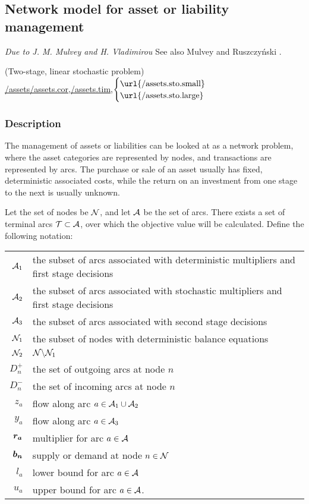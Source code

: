 \subsection{Network model for asset or liability management}%
\emph{Due to J. M. Mulvey and H. Vladimirou \cite{mulvey91}}\newline%
See also Mulvey and Ruszczy\'{n}ski \cite{mulvey95}.%

\noindent(Two-stage, linear stochastic problem)\\
\noindent\url{/assets}\url{/assets.cor},\url{/assets.tim},$\displaystyle \begin{cases} \text{\url{/assets.sto.small}}\\ \text{\url{/assets.sto.large}} \end{cases}$

\vspace{3mm}
\subsubsection{Description}
The management of assets or liabilities can be looked at as a network problem, where the asset categories are represented by nodes, and transactions are represented by arcs.  The purchase or sale of an asset usually has fixed, deterministic associated costs, while the return on an investment from one stage to the next is usually unknown.  

Let the set of nodes be ${\cal N}$, and let ${\cal A}$ be the set of arcs.  There exists a set of terminal arcs ${\cal T} \subset {\cal A}$, over which the objective value will be calculated.  Define the following notation:\newline
\vspace{0.2in}
\begin{tabular}{r@{=}p{4.2in}}
${\cal A}_1$	& the subset of arcs associated with deterministic multipliers and first stage decisions\\
${\cal A}_2$	&	the subset of arcs associated with stochastic multipliers and first stage decisions\\
${\cal A}_3$	&	the subset of arcs associated with second stage decisions\\
${\cal N}_1$	&	the subset of nodes with deterministic balance equations\\
${\cal N}_2$	&	${\cal N}\backslash {\cal N}_1$\\
$D_n^+$			&	the set of outgoing arcs at node $n$\\
$D_n^-$			&	the set of incoming arcs at node $n$\\
$z_a$			&	flow along arc $a \in {\cal A}_1 \cup {\cal A}_2$\\
$y_a$			&	flow along arc $a \in {\cal A}_3$\\
$\mathbf{\boldsymbol{r_a}}$	&	multiplier for arc $a \in {\cal A}$\\
$\mathbf{\boldsymbol{b_n}}$	&	supply or demand at node $n \in {\cal N}$\\
$l_a$			&	lower bound for arc $a \in {\cal A}$\\
$u_a$			&	upper bound for arc $a \in {\cal A}$.
\end{tabular}

